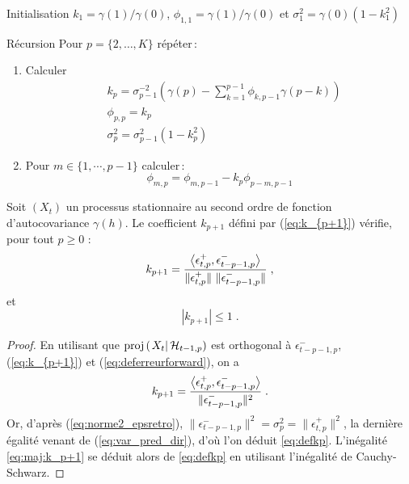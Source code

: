 \begin{algorithm}
\item[Initialisation] $k_1=\gamma(1)/\gamma(0)$, $\phi_{1,1}=\gamma(1)/\gamma(0)$ et $\sigma_1^2=\gamma(0)(1-k_1^2)$
\item[R\'ecursion] Pour $p=\{2,\dots,K\}$ r\'ep\'eter\,:
\begin{enumerate}[label=(\alph*)]
\item Calculer
\begin{align*}
&k_p=\sigma_{p-1}^{-2} \left( \gamma(p) - \sum_{k=1}^{p-1} \phi_{k,p-1} \gamma(p-k) \right) \\
&\phi_{p,p}=k_p \\
&\sigma_{p}^2=\sigma_{p-1}^2(1-k_p^2)
\end{align*}
\item Pour $m\in \{1,\cdots,p-1\}$ calculer\,:
\[
\phi_{m,p}=\phi_{m,p-1}-k_p\phi_{p-m,p-1}
\]
\end{enumerate}
\end{algorithm}

\begin{proposition}
Soit $(X_t)$ un processus stationnaire au second ordre de fonction d'autocovariance
$\gamma(h)$.
Le coefficient $k_{p+1}$ d\'efini par
(\ref{eq:k_{p+1}}) v\'erifie, pour tout $p\geq 0$ :
\begin{equation}
 \label{eq:defkp}
 k_{p+1}=\frac{\left\langle \epsilon_{t,p}^+, \epsilon_{t-p-1,p}^- \right\rangle}
        {\|\epsilon_{t,p}^+ \| \,\, \|\epsilon_{t-p-1,p}^- \|}\;,
\end{equation}
et
\begin{equation}
\label{eq:maj:k_p+1}
|k_{p+1}|\leq 1\;.
\end{equation}
\end{proposition}
\begin{proof}
En utilisant que $\proj{X_{t}}{\cH_{t-1,p}}$ est orthogonal \`a
$\epsilon_{t-p-1,p}^-$, (\ref{eq:k_{p+1}}) et (\ref{eq:deferreurforward}), on a
$$
k_{p+1}=\frac{\left\langle \epsilon_{t,p}^+, \epsilon_{t-p-1,p}^- \right\rangle}{\|\epsilon_{t-p-1,p}^- \|^2}\;.
$$
Or, d'apr\`es (\ref{eq:norme2_epsretro}), $\|\epsilon_{t-p-1,p}^-
\|^2=\sigma_p^2=\|\epsilon_{t,p}^+ \|^2$, la derni\`ere \'egalit\'e venant
de (\ref{eq:var_pred_dir}), d'o\`u l'on d\'eduit \eqref{eq:defkp}.
L'in\'egalit\'e \eqref{eq:maj:k_p+1} se d\'eduit alors de \eqref{eq:defkp}
en utilisant l'in\'egalit\'e de Cauchy-Schwarz.

\end{proof}

